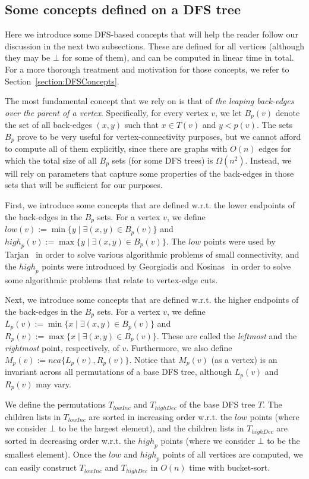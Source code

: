 \documentclass[11pt,a4paper]{article}
\begin{document}
\subsection{Some concepts defined on a DFS tree}
\label{section:someconcepts}
Here we introduce some DFS-based concepts that will help the reader follow our discussion in the next two subsections. These are defined for all vertices (although they may be $\bot$ for some of them), and can be computed in linear time in total. For a more thorough treatment and motivation for those concepts, we refer to Section~\ref{section:DFSConcepts}.

The most fundamental concept that we rely on is that of \emph{the leaping back-edges over the parent of a vertex}. Specifically, for every vertex $v$, we let $B_p(v)$ denote the set of all back-edges $(x,y)$ such that $x\in T(v)$ and $y<p(v)$. The sets $B_p$ prove to be very useful for vertex-connectivity purposes, but we cannot afford to compute all of them explicitly, since there are graphs with $O(n)$ edges for which the total size of all $B_p$ sets (for some DFS trees) is $\Omega(n^2)$. Instead, we will rely on parameters that capture some properties of the back-edges in those sets that will be sufficient for our purposes.

First, we introduce some concepts that are defined w.r.t. the lower endpoints of the back-edges in the $B_p$ sets.
For a vertex $v$, we define $\mathit{low}(v):=\min\{y\mid \exists (x,y)\in B_p(v)\}$ and $\mathit{high}_p(v):=\max\{y\mid \exists (x,y)\in B_p(v)\}$. The $\mathit{low}$ points were used by Tarjan~\cite{DBLP:journals/siamcomp/Tarjan72} in order to solve various algorithmic problems of small connectivity, and the $\mathit{high}_p$ points were introduced by Georgiadis and Kosinas~\cite{DBLP:conf/isaac/GeorgiadisK20} in order to solve some algorithmic problems that relate to vertex-edge cuts.

Next, we introduce some concepts that are defined w.r.t. the higher endpoints of the back-edges in the $B_p$ sets.
For a vertex $v$, we define $\mathit{L}_p(v):=\min\{x\mid \exists (x,y)\in B_p(v)\}$ and $\mathit{R}_p(v):=\max\{x\mid \exists (x,y)\in B_p(v)\}$. These are called the \emph{leftmost} and the \emph{rightmost} point, respectively, of $v$. Furthermore, we also define $M_p(v):=\mathit{nca}\{L_p(v),R_p(v)\}$. Notice that $M_p(v)$ (as a vertex) is an invariant across all permutations of a base DFS tree, although $L_p(v)$ and $R_p(v)$ may vary.

We define the permutations $T_\mathit{lowInc}$ and $T_\mathit{highDec}$ of the base DFS tree $T$. The children lists in $T_\mathit{lowInc}$ are sorted in increasing order w.r.t. the $\mathit{low}$ points (where we consider $\bot$ to be the largest element), and the children lists in $T_\mathit{highDec}$ are sorted in decreasing order w.r.t. the $\mathit{high}_p$ points (where we consider $\bot$ to be the smallest element). Once the $\mathit{low}$ and $\mathit{high}_p$ points of all vertices are computed, we can easily construct $T_\mathit{lowInc}$ and $T_\mathit{highDec}$ in $O(n)$ time with bucket-sort.
\end{document}
